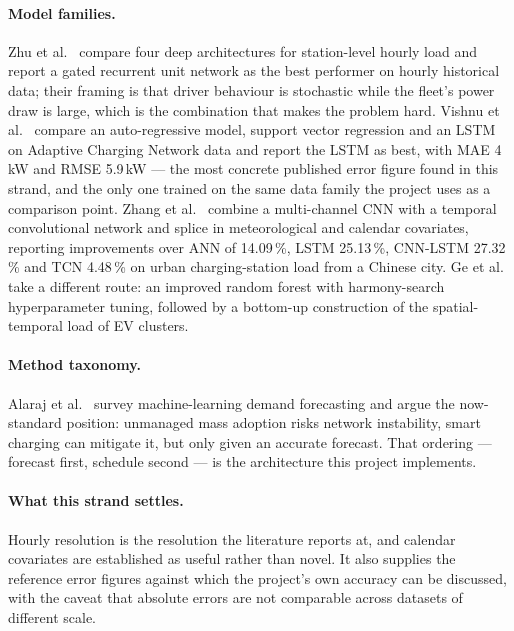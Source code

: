 \documentclass[11pt,a4paper]{article}
\begin{document}
\paragraph{Model families.} Zhu et al.~\cite{Zhu2019ShortTermEVLoadDL} compare four deep
architectures for station-level hourly load and report a gated recurrent unit network as the best
performer on hourly historical data; their framing is that driver behaviour is stochastic while the
fleet's power draw is large, which is the combination that makes the problem hard.
Vishnu et al.~\cite{Vishnu2023ShortTermEVLoadTSMLDL} compare an auto-regressive model, support vector
regression and an LSTM on Adaptive Charging Network data and report the LSTM as best, with
MAE 4\,kW and RMSE 5.9\,kW --- the most concrete published error figure found in this strand, and
the only one trained on the same data family the project uses as a comparison point.
Zhang et al.~\cite{Zhang2022MCCNNTCN} combine a multi-channel CNN with a temporal convolutional
network and splice in meteorological and calendar covariates, reporting improvements over ANN of
14.09\,\%, LSTM 25.13\,\%, CNN-LSTM 27.32\,\% and TCN 4.48\,\% on urban charging-station load from a
Chinese city. Ge et al.~\cite{Ge2020SpatialTemporalEVLoadProfile} take a different route: an improved
random forest with harmony-search hyperparameter tuning, followed by a bottom-up construction of the
spatial-temporal load of EV clusters.

\paragraph{Method taxonomy.} Alaraj et al.~\cite{Alaraj2025MLChargingDemandReview} survey machine-learning
demand forecasting and argue the now-standard position: unmanaged mass adoption risks network
instability, smart charging can mitigate it, but only given an accurate forecast. That ordering ---
forecast first, schedule second --- is the architecture this project implements.

\paragraph{What this strand settles.} Hourly resolution is the resolution the literature reports at,
and calendar covariates are established as useful rather than novel. It also supplies the reference
error figures against which the project's own accuracy can be discussed, with the caveat that
absolute errors are not comparable across datasets of different scale.
\end{document}
